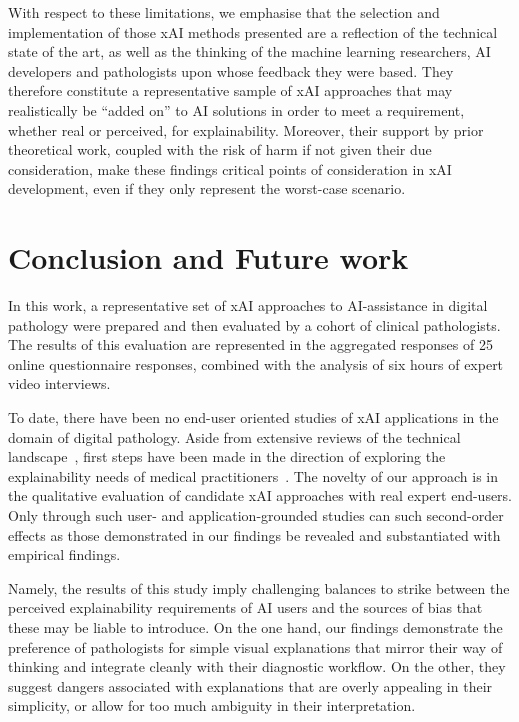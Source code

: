 \documentclass[final,5p,times,twocolumn,hyphens]{elsarticle}
\begin{document}
With respect to these limitations, we emphasise that the selection and implementation of those xAI methods presented are a reflection of the technical state of the art, as well as the thinking of the machine learning researchers, AI developers and pathologists upon whose feedback they were based. They therefore constitute a representative sample of xAI approaches that may realistically be ``added on'' to AI solutions in order to meet a requirement, whether real or perceived, for explainability. Moreover, their support by prior theoretical work, coupled with the risk of harm if not given their due consideration, make these findings critical points of consideration in xAI development, even if they only represent the worst-case scenario.

\section{Conclusion and Future work}
\label{sec:FutureWork}

In this work, a representative set of xAI approaches to AI-assistance in digital pathology were prepared and then evaluated by a cohort of clinical pathologists. The results of this evaluation are represented in the aggregated responses of 25 online questionnaire responses, combined with the analysis of six hours of expert video interviews. 

To date, there have been no end-user oriented studies of xAI applications in the domain of digital pathology. Aside from extensive reviews of the technical landscape~\cite{yang2021unbox, poceviciute_survey_2020}, first steps have been made in the direction of exploring the explainability needs of medical practitioners~\cite{liao2020questioning,cai2019hello,wang_designing_2019}. The novelty of our approach is in the qualitative evaluation of candidate xAI approaches with real expert end-users. Only through such user- and application-grounded studies can such second-order effects as those demonstrated in our findings be revealed and substantiated with empirical findings.

Namely, the results of this study imply challenging balances to strike between the perceived explainability requirements of AI users and the sources of bias that these may be liable to introduce. On the one hand, our findings demonstrate the preference of pathologists for simple visual explanations that mirror their way of thinking and integrate cleanly with their diagnostic workflow. On the other, they suggest dangers associated with explanations that are overly appealing in their simplicity, or allow for too much ambiguity in their interpretation. 
\end{document}
